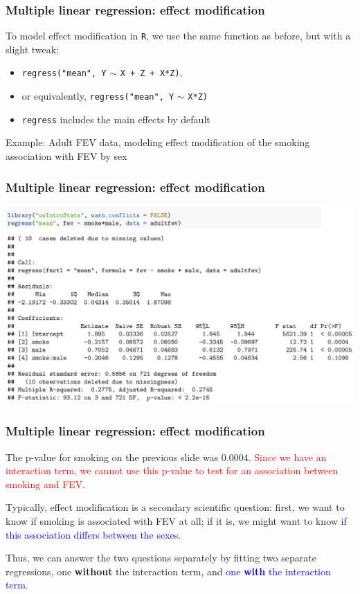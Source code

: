\documentclass[12pt, 
hyperref={colorlinks=true, linkcolor=blue, urlcolor=cyan}]{beamer}
\begin{document}
\begin{frame}
\frametitle{Multiple linear regression: effect modification}

To model effect modification in \texttt{R}, we use the same function as before, but with a slight tweak:
\begin{itemize}
\item \texttt{regress("mean", Y} $\sim$ \texttt{X + Z + X*Z)}, 
\item or equivalently, \texttt{regress("mean", Y} $\sim$ \texttt{X*Z)}
\item[] {\small \texttt{regress} includes the main effects by default }
\end{itemize}

Example: Adult FEV data, modeling effect modification of the smoking association with FEV by sex
\end{frame}

\begin{frame}
\frametitle{Multiple linear regression: effect modification}
\vspace{-1cm}\hspace*{-0.5cm}
\includegraphics[width=1.1\textwidth]{plots/fev_smoke_sex_em.png}

\end{frame}

\begin{frame}
\frametitle{Multiple linear regression: effect modification}

The p-value for smoking on the previous slide was 0.0004. \textcolor{red}{Since we have an interaction term, we cannot use this p-value to test for an association between smoking and FEV}.

Typically, effect modification is a secondary scientific question: first, we want to know if smoking is associated with FEV at all; if it is, we might want to know \textcolor{blue}{if this association differs between the sexes}.

Thus, we can answer the two questions separately by fitting two separate regressions, one \textbf{without} the interaction term, and \textcolor{blue}{one \textbf{with} the interaction term}. 
\end{frame}
\end{document}
